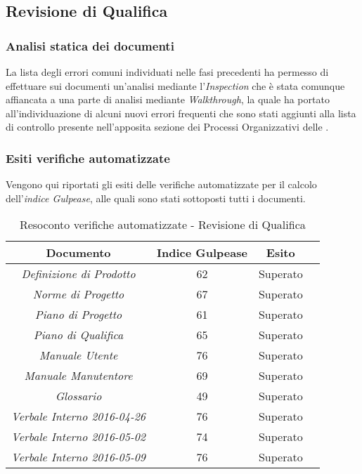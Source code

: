 \subsection{Revisione di Qualifica}

\subsubsection{Analisi statica dei documenti}
La lista degli errori comuni individuati nelle fasi precedenti ha permesso di effettuare sui documenti un'analisi mediante l'\textit{Inspection} che è stata comunque affiancata a una parte di analisi mediante \textit{Walkthrough}, la quale ha portato all'individuazione di alcuni nuovi errori frequenti che sono stati aggiunti alla lista di controllo presente nell'apposita sezione dei Processi Organizzativi delle \textit{\NdP}.

\subsubsection{Esiti verifiche automatizzate}
Vengono qui riportati gli esiti delle verifiche automatizzate per il calcolo dell'\textit{indice Gulpease}, alle quali sono stati sottoposti tutti i documenti.
\begin{table}[h]
\begin{center}
\begin{tabular}{|c|c|c|c|}
\hline \textbf{Documento} & \textbf{Indice Gulpease} & \textbf{Esito}\\
\hline
\emph{Definizione di Prodotto} & 62 & Superato \\
\emph{Norme di Progetto} & 67 & Superato \\
\emph{Piano di Progetto} & 61 & Superato \\
\emph{Piano di Qualifica} & 65 & Superato \\
\emph{Manuale Utente} & 76 & Superato \\
\emph{Manuale Manutentore} & 69 & Superato \\
\emph{Glossario} & 49 & Superato \\
\emph{Verbale Interno 2016-04-26} & 76 & Superato \\
\emph{Verbale Interno 2016-05-02} & 74 & Superato \\
\emph{Verbale Interno 2016-05-09} & 76 & Superato \\
\hline
\end{tabular}
\caption{Resoconto verifiche automatizzate - Revisione di Qualifica}
\end{center}
\end{table}

